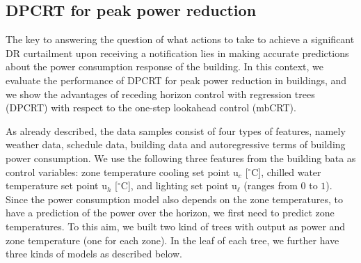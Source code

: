 \subsection{DPCRT for peak power reduction}

The key to answering the question of what actions to take to achieve a significant DR curtailment upon receiving a notification lies in making accurate predictions about the power consumption response of the building. 
In this context, we evaluate the performance of DPCRT for peak power reduction in buildings, and we show the advantages of receding horizon control with regression trees (DPCRT) with respect to the one-step lookahead control (mbCRT). 

As already described, the data samples consist of four types of features, namely weather data, schedule data, building data and autoregressive terms of building power consumption. 
We use the following three features from the building bata as control variables: zone temperature cooling set point $\mathrm{u}_c$ [$^{\circ}$C], chilled water temperature set point $\mathrm{u}_h$ [$^{\circ}$C], and lighting set point $\mathrm{u}_\ell$ (ranges from $0$ to $1$). Since the power consumption model also depends on the zone temperatures, to have a prediction of the power over the horizon, we first need to predict zone temperatures. To this aim, we built two kind of trees with output as power and zone temperature (one for each zone). In the leaf of each tree, we further have three kinds of models as described below.
